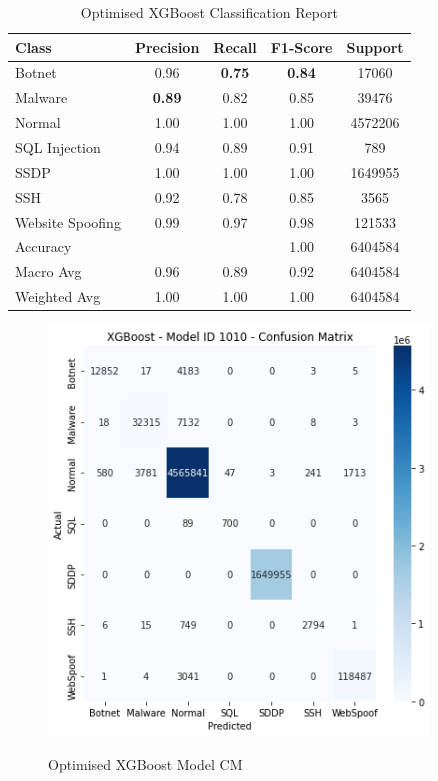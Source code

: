 \clearpage
\begin{table}[hp]
  \centering
  \caption{Optimised XGBoost Classification Report}
  \label{tab:optimised_xgboost}
    \begin{tabular}{lcccc}
    \toprule
    Class & Precision & Recall & F1-Score & Support \\
    \midrule
    Botnet & 0.96 & {\color{red}\bfseries 0.75} & {\color{red}\bfseries 0.84} & 17060 \\
    Malware & {\color{red}\bfseries 0.89} & 0.82 & 0.85 & 39476 \\
    Normal & 1.00 & 1.00 & 1.00 & 4572206 \\
    SQL Injection & 0.94 & 0.89 & 0.91 & 789 \\
    SSDP & 1.00 & 1.00 & 1.00 & 1649955 \\
    SSH & 0.92 & 0.78 & 0.85 & 3565 \\
    Website Spoofing & 0.99 & 0.97 & 0.98 & 121533 \\
    \midrule
    Accuracy & & & 1.00 & 6404584 \\
    Macro Avg & 0.96 & 0.89 & 0.92 & 6404584 \\
    Weighted Avg & 1.00 & 1.00 & 1.00 & 6404584 \\
    \bottomrule
    \end{tabular}
\end{table}

\begin{figure}[H]
\centering
\caption{Optimised XGBoost Model CM}
\includegraphics[width=0.9\textwidth]{Appendices/Images/XGB/xgb_1010_cm.png}
\label{fig:xgb_optimised_cm}
\end{figure}



